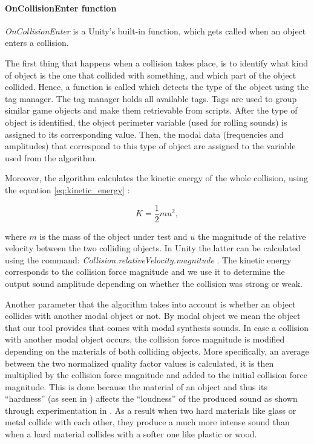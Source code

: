 \paragraph{OnCollisionEnter function\\}

\textit{OnCollisionEnter} \cite{bib:unity_doc} is a Unity\textsuperscript{\textregistered}'s built-in function, which gets called when an object enters a collision.

The first thing that happens when a collision takes place, is to identify what kind of object is the one that collided with something, and which part of the object collided. Hence, a function is called which detects the type of the object using the tag manager. The tag manager holds all available tags. Tags are used to group similar game objects and make them retrievable from scripts. After the type of object is identified, the object perimeter variable (used for rolling sounds) is assigned to its corresponding value. Then, the modal data (frequencies and amplitudes) that correspond to this type of object are assigned to the variable used from the algorithm.

Moreover, the algorithm calculates the kinetic energy of the whole collision, using the equation \ref{eq:kinetic_energy} \cite{crowell2003conservation}: 

\begin{equation}\label{eq:kinetic_energy}
K = \frac{1}{2} m u^2,
\end{equation}

\noindent where $m$ is the mass of the object under test and $u$ the magnitude of the relative velocity between the two colliding objects. In Unity\textsuperscript{\textregistered} the latter can be calculated using the command: \textit{Collision.relativeVelocity.magnitude} \cite{bib:unity_doc}. The kinetic energy corresponds to the collision force magnitude and we use it to determine the output sound amplitude depending on whether the collision was strong or weak.

Another parameter that the algorithm takes into account is whether an object collides with another modal object or not. By modal object we mean the object that our tool provides that comes with modal synthesis sounds. In case a collision with another modal object occurs, the collision force magnitude is modified depending on the materials of both colliding objects. More specifically, an average between the two normalized quality factor values is calculated, it is then multiplied by the collision force magnitude and added to the initial collision force magnitude. This is done because the material of an object and thus its ``hardness'' (as seen in \cite{giordano2003material}) affects the ``loudness'' of the produced sound as shown through experimentation in \cite{freed1990auditory}. As a result when two hard materials like glass or metal collide with each other, they produce a much more intense sound than when a hard material collides with a softer one like plastic or wood.  

